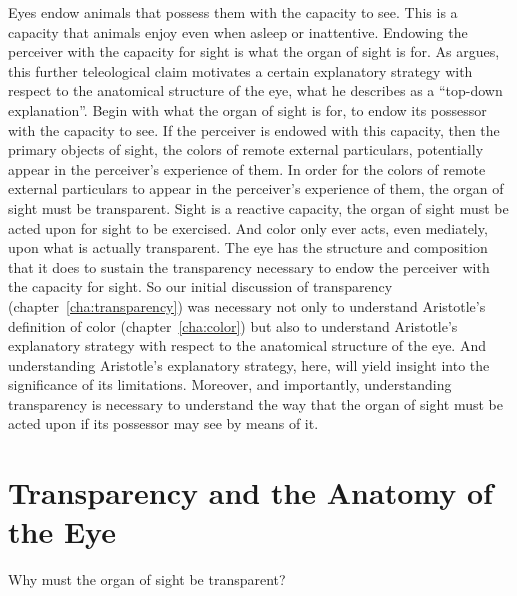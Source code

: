 Eyes endow animals that possess them with the capacity to see. This is a capacity that animals enjoy even when asleep or inattentive. Endowing the perceiver with the capacity for sight is what the organ of sight is for. As \citet{Johansen:1997zr} argues, this further teleological claim motivates a certain explanatory strategy with respect to the anatomical structure of the eye, what he describes as a ``top-down explanation''. Begin with what the organ of sight is for, to endow its possessor with the capacity to see. If the perceiver is endowed with this capacity, then the primary objects of sight, the colors of remote external particulars, potentially appear in the perceiver's experience of them. In order for the colors of remote external particulars to appear in the perceiver's experience of them, the organ of sight must be transparent. Sight is a reactive capacity, the organ of sight must be acted upon for sight to be exercised. And color only ever acts, even mediately, upon what is actually transparent. The eye has the structure and composition that it does to sustain the transparency necessary to endow the perceiver with the capacity for sight. So our initial discussion of transparency (chapter~\ref{cha:transparency}) was necessary not only to understand Aristotle's definition of color (chapter~\ref{cha:color}) but also to understand Aristotle's explanatory strategy with respect to the anatomical structure of the eye. And understanding Aristotle's explanatory strategy, here, will yield insight into the significance of its limitations. Moreover, and importantly, understanding transparency is necessary to understand the way that the organ of sight must be acted upon if its possessor may see by means of it.


\section{Transparency and the Anatomy of the Eye} %
\label{sec:transparency_and_the_anatomy_of_the_eye}

Why must the organ of sight be transparent?

